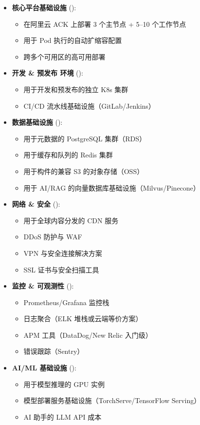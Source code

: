 \documentclass[11pt, a4paper, oneside]{article}
\begin{document}
\begin{itemize}
    \item \textbf{核心平台基础设施} ():
    \begin{itemize}
        \item 在阿里云 ACK 上部署 3 个主节点 + 5--10 个工作节点
        \item 用于 Pod 执行的自动扩缩容配置
        \item 跨多个可用区的高可用部署
    \end{itemize}
    
    \item \textbf{开发 \& 预发布 环境} ():
    \begin{itemize}
        \item 用于开发和预发布的独立 K8s 集群
        \item CI/CD 流水线基础设施（GitLab/Jenkins）
    \end{itemize}
    
    \item \textbf{数据基础设施} ():
    \begin{itemize}
        \item 用于元数据的 PostgreSQL 集群（RDS）
        \item 用于缓存和队列的 Redis 集群
        \item 用于构件的兼容 S3 的对象存储（OSS）
        \item 用于 AI/RAG 的向量数据库基础设施（Milvus/Pinecone）
    \end{itemize}
    
    \item \textbf{网络 \& 安全} ():
    \begin{itemize}
        \item 用于全球内容分发的 CDN 服务
        \item DDoS 防护与 WAF
        \item VPN 与安全连接解决方案
        \item SSL 证书与安全扫描工具
    \end{itemize}
    
    \item \textbf{监控 \& 可观测性} ():
    \begin{itemize}
        \item Prometheus/Grafana 监控栈
        \item 日志聚合（ELK 堆栈或云端等价方案）
        \item APM 工具（DataDog/New Relic 入门级）
        \item 错误跟踪（Sentry）
    \end{itemize}
    
    \item \textbf{AI/ML 基础设施} ():
    \begin{itemize}
        \item 用于模型推理的 GPU 实例
        \item 模型部署服务基础设施（TorchServe/TensorFlow Serving）
        \item AI 助手的 LLM API 成本
    \end{itemize}
\end{itemize}
\end{document}
